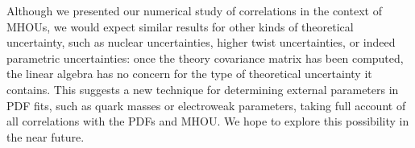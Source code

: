 Although we presented our numerical study of correlations in the context of MHOUs, we would expect similar results for other kinds of theoretical uncertainty, such as nuclear uncertainties, higher twist uncertainties, or indeed parametric uncertainties: once the theory covariance matrix has been computed, the linear algebra has no concern for the type of theoretical uncertainty it contains. This suggests a new technique for determining external parameters in PDF fits, such as quark masses or electroweak parameters, taking full account of all correlations with the PDFs and MHOU. We hope to explore this possibility in the near future.
